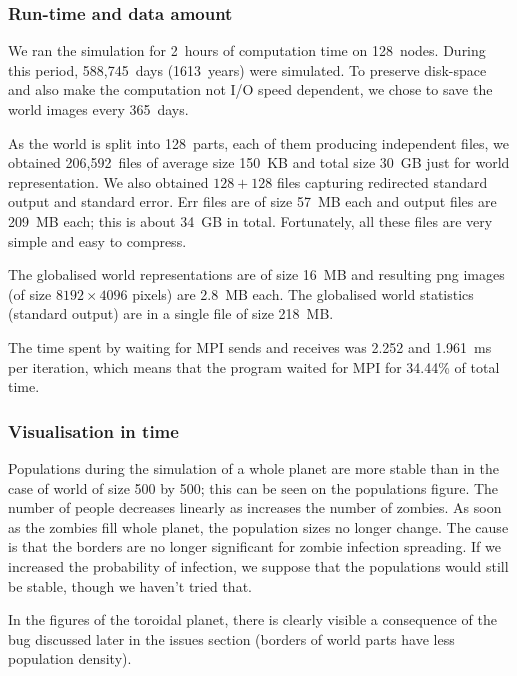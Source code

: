 \documentclass[a4paper]{article}
\begin{document}
\subsubsection{Run-time and data amount}

We ran the simulation for 2~hours of computation time on 128~nodes.
During this period, 588,745~days (1613~years) were simulated.
To preserve disk-space and also make the computation not I/O speed dependent, we chose to save the world images every 365~days.

As the world is split into 128~parts, each of them producing independent files, we obtained 206,592~files of average size 150~KB and total size 30~GB just for world representation.
We also obtained $128 + 128$ files capturing redirected standard output and standard error.
Err files are of size 57~MB each and output files are 209~MB each; this is about 34~GB in total.
Fortunately, all these files are very simple and easy to compress.

The globalised world representations are of size 16~MB and resulting png images (of size $8192\times 4096$ pixels) are 2.8~MB each.
The globalised world statistics (standard output) are in a single file of size 218~MB.

The time spent by waiting for MPI sends and receives was 2.252 and 1.961~ms per iteration, which means that the program waited for MPI for 34.44\% of total time.

\subsubsection{Visualisation in time}

Populations during the simulation of a whole planet are more stable than in the case of world of size 500 by 500; this can be seen on the populations figure.
The number of people decreases linearly as increases the number of zombies.
As soon as the zombies fill whole planet, the population sizes no longer change.
The cause is that the borders are no longer significant for zombie infection spreading.
If we increased the probability of infection, we suppose that the populations would still be stable, though we haven't tried that.

In the figures of the toroidal planet, there is clearly visible a consequence of the bug discussed later in the issues section (borders of world parts have less population density).
\end{document}
